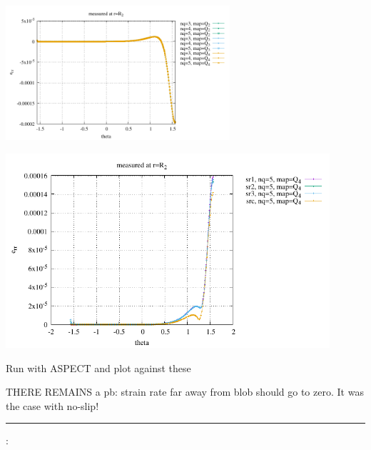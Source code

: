 \begin{center}
\includegraphics[width=8.3cm]{python_codes/fieldstone_152/results/exp2_axisymmetric/err_R2}\\
\end{center}


\includegraphics[width=12cm]{python_codes/fieldstone_152/results/exp2_axisymmetric/sr_R2_comparison}

Run with ASPECT and plot against these



THERE REMAINS a pb: strain rate far away from blob should go to zero. It was the case with no-slip!





\newpage
\par\noindent\rule{\textwidth}{0.4pt}

\vspace{.5cm}

\begin{center}
\end{center}

\vspace{.5cm}

\noindent\Literature:\\
\\


